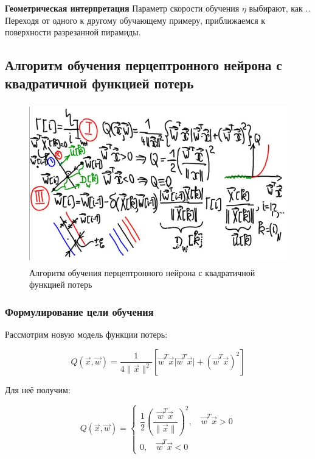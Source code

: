 \documentclass{article}
\numberwithin{equation}{subsection}
\begin{document}
\textbf{Геометрическая интерпретация}
Параметр скорости обучения $\eta$ выбирают, как .. 
Переходя от одного к другому обучающему примеру, приближаемся к поверхности разрезанной 
пирамиды.

\subsection{Алгоритм обучения перцептронного нейрона с квадратичной функцией потерь}

\begin{figure}[htbp]
    \centering
    \includegraphics[height=7cm]{hyperflat_8_1.jpeg}
    \caption{Алгоритм обучения перцептронного нейрона с квадратичной функцией потерь}
    \label{hyperflat_8_1}
\end{figure}





\subsubsection{Формулирование цели обучения}

Рассмотрим новую модель функции потерь:

\begin{equation}
    Q\left( \vec{x}, \vec{w} \right) = \dfrac{1}{4 \| \vec{x} \| ^2 } 
    \left[
        \vec{w}^T \vec{x} \lvert \vec{w}^T \vec{x} \rvert +
        \left( \vec{w}^T \vec{x} \right)^2
    \right]
\end{equation}

Для неё получим:

\begin{equation}
    Q\left( \vec{x}, \vec{w} \right) =
    \begin{cases}
        \dfrac{1}{2} \left( \dfrac{\vec{w}^T \vec{x}}{\| \vec{x} \|} \right) ^2, 
        \quad \vec{w}^T \vec{x} > 0\\
        0, \quad \vec{w}^T \vec{x} < 0
    \end{cases}
\end{equation}
\end{document}
